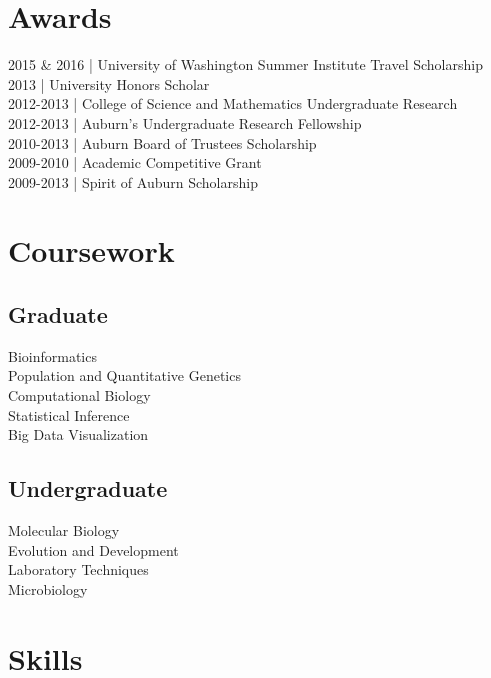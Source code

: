 \documentclass[]{deedy-resume-openfont}
\begin{document}
\begin{minipage}[t]{0.33\textwidth}

\section{Awards} 
2015 \& 2016 | University of Washington Summer Institute Travel Scholarship \\
2013 |	      University Honors Scholar \\
2012-2013 |	      College of Science and Mathematics Undergraduate Research \\
2012-2013 |	      Auburn’s Undergraduate Research Fellowship \\
2010-2013 |		 Auburn Board of Trustees Scholarship \\
2009-2010 |		 Academic Competitive Grant \\
2009-2013 |	 Spirit of Auburn Scholarship \\

\sectionsep

\section{Coursework}
\subsection{Graduate}
Bioinformatics \\
Population and Quantitative Genetics \\
Computational Biology \\
Statistical Inference \\
Big Data Visualization \\
\sectionsep

\subsection{Undergraduate}
Molecular Biology \\
Evolution and Development \\
Laboratory Techniques \\
Microbiology \\
\sectionsep


\section{Skills}

\end{minipage}
\end{document}
